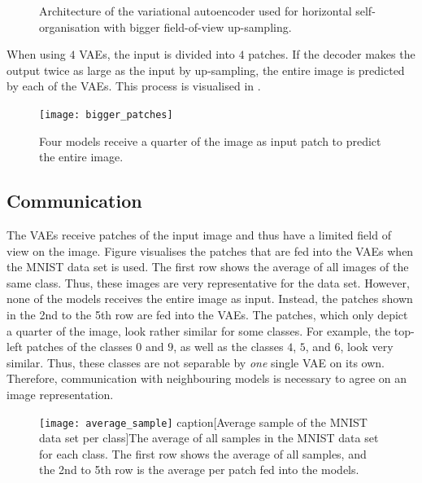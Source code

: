 \begin{figure}[h]
{
}
    \caption[Architecture of the VAE used for horizontal self-organisation with bigger field-of-view up-sampling]{Architecture of the variational autoencoder used for horizontal self-organisation with bigger field-of-view up-sampling.}
\end{figure}

When using $4$ VAEs, the input is divided into $4$ patches. If the decoder makes the output twice as large as the input by up-sampling,  the entire image is predicted by each of the VAEs. This process is visualised in .

\begin{figure}[h]
    \centering
    \texttt{[image: bigger\_patches]}
    \caption[Reconstruction of bigger output than input patches]{Four models receive a quarter of the image as input patch to predict the entire image.}
\end{figure}



\subsection{Communication}
The VAEs receive patches of the input image and thus have a limited field of view on the image.
Figure  visualises the patches that are fed into the VAEs when the MNIST data set \cite{Lecun_Bottou_Bengio_Haffner_1998} is used.
The first row shows the average of all images of the same class. Thus, these images are very representative for the data set.
However, none of the models receives the entire image as input. Instead, the patches shown in the 2nd to the 5th row are fed into the VAEs.
The patches, which only depict a quarter of the image, look rather similar for some classes. For example, the top-left patches of the classes $0$ and $9$, as well as the classes $4$, $5$, and $6$, look very similar.
Thus, these classes are not separable by \emph{one} single VAE on its own.
Therefore, communication with neighbouring models is necessary to agree on an image representation.

\begin{figure}[h]
    \centering
    \texttt{[image: average\_sample]}
    caption[Average sample of the MNIST data set per class]{The average of all samples in the MNIST data set for each class. The first row shows the average of all samples, and the 2nd to 5th row is the average per patch fed into the models.}
\end{figure}


